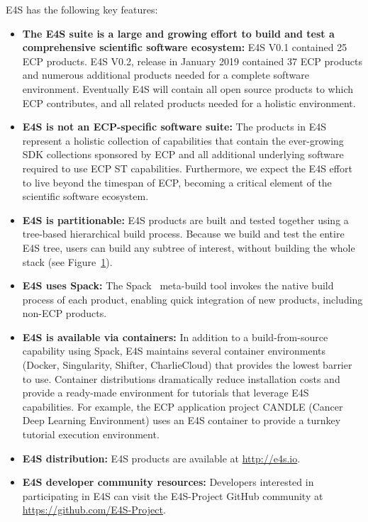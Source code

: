 \begin{figure}
	\label{fig:e4s-build-tree}
\end{figure}

E4S has the following key features:
\begin{itemize}
	\item \textbf{The E4S suite is a large and growing effort to build and test a comprehensive scientific software ecosystem:} E4S V0.1 contained 25 ECP products.  E4S V0.2, release in January 2019 contained 37 ECP products and numerous additional products needed for a complete software environment.  Eventually E4S will contain all open source products to which ECP contributes, and all related products needed for a holistic environment.
	\item \textbf{E4S is not an ECP-specific software suite:}  The products in E4S represent a holistic collection of capabilities that contain the ever-growing SDK collections sponsored by ECP and all additional underlying software required to use ECP ST capabilities.  Furthermore, we expect the E4S effort to live beyond the timespan of ECP, becoming a critical element of the scientific software ecosystem.
	\item \textbf{E4S is partitionable:} E4S products are built and tested together using a tree-based hierarchical build process.  Because we build and test the entire E4S tree, users can build any subtree of interest, without building the whole stack (see Figure~\ref{fig:e4s-build-tree}).
	\item \textbf{E4S uses Spack:} The Spack~\cite{gamblin+:ecp18-spack-tutorial} meta-build tool invokes the native build process of each product, enabling quick integration of new products, including non-ECP products.
	\item \textbf{E4S is available via containers:} In addition to a build-from-source capability using Spack, E4S maintains several container environments (Docker, Singularity, Shifter, CharlieCloud) that provides the lowest barrier to use.  Container distributions dramatically reduce installation costs and provide a ready-made environment for tutorials that leverage E4S capabilities.  For example, the ECP  application project CANDLE (Cancer Deep Learning Environment) uses an E4S container to provide a turnkey tutorial execution environment.
	\item \textbf{E4S distribution:} E4S products are available at \url{http://e4s.io}.
	\item \textbf{E4S developer community resources:} Developers interested in participating in E4S can visit the E4S-Project GitHub community at \url{https://github.com/E4S-Project}.	
\end{itemize}


